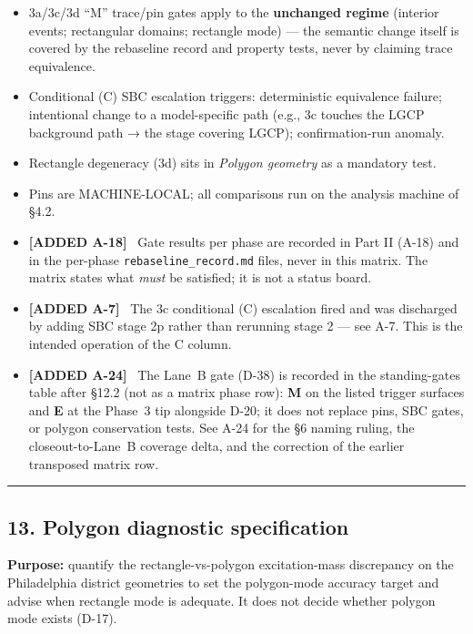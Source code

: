 \documentclass[
  10pt,
]{article}
\providecommand{\tightlist}{%
  \setlength{\itemsep}{0pt}\setlength{\parskip}{0pt}}
\newcommand{\amdnew}[1]{{\color{amdcolor}\footnotesize\textbf{[ADDED #1]}}\ }
\begin{document}
\begin{itemize}
\tightlist
\item
  3a/3c/3d ``M'' trace/pin gates apply to the \textbf{unchanged regime} (interior events; rectangular domains; rectangle mode) --- the semantic change itself is covered by the rebaseline record and property tests, never by claiming trace equivalence.
\item
  Conditional (C) SBC escalation triggers: deterministic equivalence failure; intentional change to a model-specific path (e.g., 3c touches the LGCP background path → the stage covering LGCP); confirmation-run anomaly.
\item
  Rectangle degeneracy (3d) sits in \emph{Polygon geometry} as a mandatory test.
\item
  Pins are MACHINE-LOCAL; all comparisons run on the analysis machine of §4.2.
\item
  \amdnew{A-18} Gate results per phase are recorded in Part II (A-18) and in the per-phase \texttt{rebaseline\_record.md} files, never in this matrix. The matrix states what \emph{must} be satisfied; it is not a status board.
\item
  \amdnew{A-7} The 3c conditional (C) escalation fired and was discharged by adding SBC stage 2p rather than rerunning stage 2 --- see A-7. This is the intended operation of the C column.
\item
  \amdnew{A-24} The Lane~B gate (D-38) is recorded in the standing-gates table after §12.2 (not as a matrix phase row): \textbf{M} on the listed trigger surfaces and \textbf{E} at the Phase~3 tip alongside D-20; it does not replace pins, SBC gates, or polygon conservation tests. See A-24 for the §6 naming ruling, the closeout-to-Lane~B coverage delta, and the correction of the earlier transposed matrix row.
\end{itemize}

\begin{center}\rule{0.5\linewidth}{0.5pt}\end{center}

\hypertarget{polygon-diagnostic-specification}{%
\subsection{13. Polygon diagnostic specification}\label{polygon-diagnostic-specification}}

\textbf{Purpose:} quantify the rectangle-vs-polygon excitation-mass discrepancy on the Philadelphia district geometries to set the polygon-mode accuracy target and advise when rectangle mode is adequate. It does not decide whether polygon mode exists (D-17).
\end{document}
